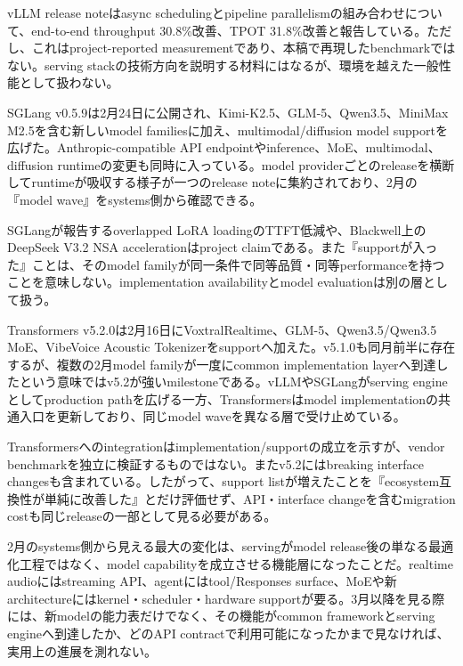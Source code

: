 \begin{claimboundary}
vLLM release noteはasync schedulingとpipeline parallelismの組み合わせについて、end-to-end throughput 30.8\%改善、TPOT 31.8\%改善と報告している。ただし、これはproject-reported measurementであり、本稿で再現したbenchmarkではない。serving stackの技術方向を説明する材料にはなるが、環境を越えた一般性能として扱わない。\autocite{src-5041feb6f87f,src-67307025f5d9}
\end{claimboundary}

SGLang v0.5.9は2月24日に公開され、Kimi-K2.5、GLM-5、Qwen3.5、MiniMax M2.5を含む新しいmodel familiesに加え、multimodal/diffusion model supportを広げた。Anthropic-compatible API endpointやinference、MoE、multimodal、diffusion runtimeの変更も同時に入っている。model providerごとのreleaseを横断してruntimeが吸収する様子が一つのrelease noteに集約されており、2月の『model wave』をsystems側から確認できる。\autocite{src-5bc0746a47c6}


\begin{claimboundary}
SGLangが報告するoverlapped LoRA loadingのTTFT低減や、Blackwell上のDeepSeek V3.2 NSA accelerationはproject claimである。また『supportが入った』ことは、そのmodel familyが同一条件で同等品質・同等performanceを持つことを意味しない。implementation availabilityとmodel evaluationは別の層として扱う。\autocite{src-5bc0746a47c6}
\end{claimboundary}

Transformers v5.2.0は2月16日にVoxtralRealtime、GLM-5、Qwen3.5/Qwen3.5 MoE、VibeVoice Acoustic Tokenizerをsupportへ加えた。v5.1.0も同月前半に存在するが、複数の2月model familyが一度にcommon implementation layerへ到達したという意味ではv5.2が強いmilestoneである。vLLMやSGLangがserving engineとしてproduction pathを広げる一方、Transformersはmodel implementationの共通入口を更新しており、同じmodel waveを異なる層で受け止めている。\autocite{src-0bd04783f97b,src-a43d64987293}


\begin{claimboundary}
Transformersへのintegrationはimplementation/supportの成立を示すが、vendor benchmarkを独立に検証するものではない。またv5.2にはbreaking interface changesも含まれている。したがって、support listが増えたことを『ecosystem互換性が単純に改善した』とだけ評価せず、API・interface changeを含むmigration costも同じreleaseの一部として見る必要がある。\autocite{src-0bd04783f97b,src-a43d64987293}
\end{claimboundary}

2月のsystems側から見える最大の変化は、servingがmodel release後の単なる最適化工程ではなく、model capabilityを成立させる機能層になったことだ。realtime audioにはstreaming API、agentにはtool/Responses surface、MoEや新architectureにはkernel・scheduler・hardware supportが要る。3月以降を見る際には、新modelの能力表だけでなく、その機能がcommon frameworkとserving engineへ到達したか、どのAPI contractで利用可能になったかまで見なければ、実用上の進展を測れない。\autocite{src-5041feb6f87f,src-5bc0746a47c6,src-a43d64987293}
